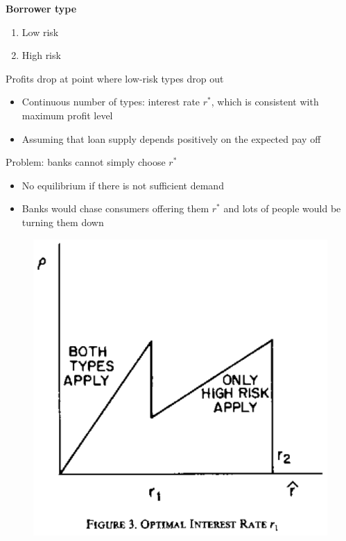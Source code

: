 \documentclass{beamer}
\begin{document}
\begin{frame} 
 \textbf{Borrower type}
 \begin{enumerate}
   \item Low risk
   \item High risk
 \end{enumerate}
 \medskip
 Profits drop at point where low-risk types drop out
 \begin{itemize}
   \item Continuous number of types: interest rate $r^*$, which is consistent with maximum profit level
   \item Assuming that loan supply depends positively on the expected pay off
 \end{itemize} 
 \medskip
 Problem: banks cannot simply choose $r^*$
 \begin{itemize}
   \item No equilibrium if there is not sufficient demand
   \item Banks would chase consumers offering them $r^*$ and lots of people would be turning them down
 \end{itemize}
\end{frame}

\begin{frame}
  \begin{figure}
    \includegraphics{stiglitz_weiss3.eps}
  \end{figure}
\end{frame}
\end{document}
